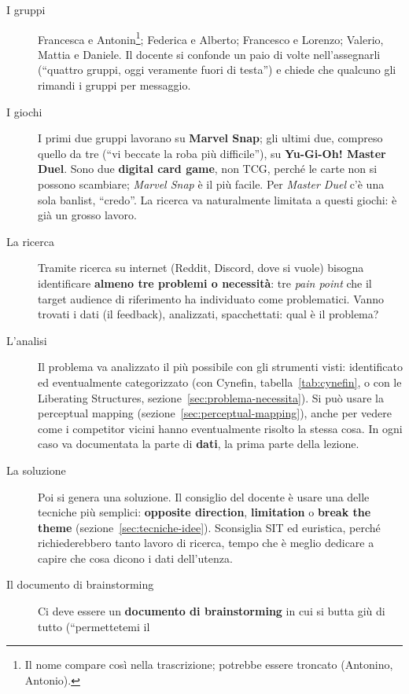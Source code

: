 \begin{description}
  \item[I gruppi] Francesca e Antonin\footnote{Il nome compare così nella
        trascrizione; potrebbe essere troncato (Antonino, Antonio).};
        Federica e Alberto; Francesco e Lorenzo; Valerio, Mattia e Daniele.
        Il docente si confonde un paio di volte nell'assegnarli (``quattro
        gruppi, oggi veramente fuori di testa'') e chiede che qualcuno gli
        rimandi i gruppi per messaggio.
  \item[I giochi] I primi due gruppi lavorano su \textbf{Marvel Snap}; gli
        ultimi due, compreso quello da tre (``vi beccate la roba più
        difficile''), su \textbf{Yu-Gi-Oh! Master Duel}. Sono due
        \textbf{digital card game}, non TCG, perché le carte non si possono
        scambiare; \emph{Marvel Snap} è il più facile. Per \emph{Master Duel}
        c'è una sola banlist, ``credo''. La ricerca va naturalmente limitata a
        questi giochi: è già un grosso lavoro.
  \item[La ricerca] Tramite ricerca su internet (Reddit, Discord, dove si
        vuole) bisogna identificare \textbf{almeno tre problemi o necessità}:
        tre \emph{pain point} che il target audience di riferimento ha
        individuato come problematici. Vanno trovati i dati (il feedback),
        analizzati, spacchettati: qual è il problema?
  \item[L'analisi] Il problema va analizzato il più possibile con gli
        strumenti visti: identificato ed eventualmente categorizzato (con
        Cynefin, tabella~\ref{tab:cynefin}, o con le Liberating Structures,
        sezione~\ref{sec:problema-necessita}). Si può usare la perceptual
        mapping (sezione~\ref{sec:perceptual-mapping}), anche per vedere come
        i competitor vicini hanno eventualmente risolto la stessa cosa. In
        ogni caso va documentata la parte di \textbf{dati}, la prima parte
        della lezione.
  \item[La soluzione] Poi si genera una soluzione. Il consiglio del docente è
        usare una delle tecniche più semplici: \textbf{opposite direction},
        \textbf{limitation} o \textbf{break the theme}
        (sezione~\ref{sec:tecniche-idee}). Sconsiglia SIT ed euristica,
        perché richiederebbero tanto lavoro di ricerca, tempo che è meglio
        dedicare a capire che cosa dicono i dati dell'utenza.
  \item[Il documento di brainstorming] Ci deve essere un \textbf{documento di
        brainstorming} in cui si butta giù di tutto (``permettetemi il

\end{description}
